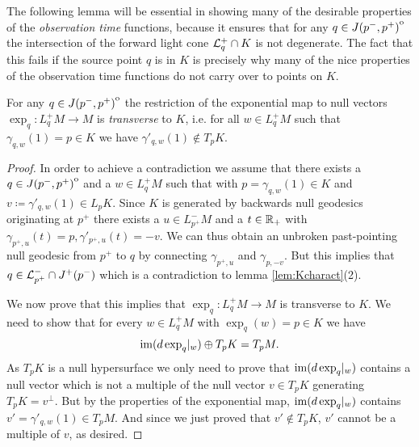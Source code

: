 The following lemma will be essential in showing many of the desirable properties of the \emph{observation time} functions, because it ensures that for any $q\in {\kern0ptJ(p^-,p^+)}^{\mathrm{o}}$ the intersection of the forward light cone ${\mathcal{L}}^+_{q}\cap K$ is not degenerate. The fact that this fails if the source point $q$ is in $K$ is precisely why many of the nice properties of the observation time functions do not carry over to points on $K$.
\begin{lemma}\label{lem:transversality}
For any $q\in {\kern0ptJ(p^-,p^+)}^{\mathrm{o}}$ the restriction of the exponential map to null vectors $\exp_q:L^+_qM\to M$ is \emph{transverse} to $K$, i.e. for all $w\in L^+_qM$ such that $\gamma_{q,w}(1) = p\in K$ we have $\gamma'_{q,w}(1)\notin T_pK$.
\end{lemma}
\begin{proof}
    In order to achieve a contradiction we assume that there exists a $q\in {\kern0ptJ(p^-,p^+)}^{\mathrm{o}}$ and a $w\in L^+_qM$ such that with $p=\gamma_{q,w}(1)\in K$ and $v\coloneqq \gamma'_{q,w}(1)\in L_pK$.
    Since $K$ is generated by backwards null geodesics originating at $p^+$ there exists a $u\in L^-_{p^+}M$ and a $t\in \mathbb{R}_+$ with $\gamma_{p^+,u}(t)=p, \gamma'_{p^+,u}(t)=-v$. We can thus obtain an unbroken past-pointing null geodesic from $p^+$ to $q$ by connecting $\gamma_{p^+,u}$ and $\gamma_{p,-v}$. But this implies that $q\in {\mathcal{L}}^-_{p^+}\cap J^+(p^-)$ which is a contradiction to lemma \ref{lem:Kcharact}(2).

    We now prove that this implies that $\exp_q:L^+_qM\to M$ is transverse to $K$. We need to show that for every $w\in L^+_qM$ with $\exp_q(w)=p\in K$ we have 
    \[
        \operatorname{im}(d\exp_q\rvert_w) \oplus T_pK = T_pM.
    \]
    As $T_pK$ is a null hypersurface we only need to prove that $\operatorname{im}(d\exp_q\rvert_w)$ contains a null vector which is not a multiple of the null vector $v\in T_pK$ generating $T_pK = v^\perp$. But by the properties of the exponential map, $\operatorname{im}(d\exp_q\rvert_w)$ contains $v' = \gamma'_{q,w}(1) \in T_pM$. And since we just proved that $v'\notin T_pK$, $v'$ cannot be a multiple of $v$, as desired.
\end{proof}

